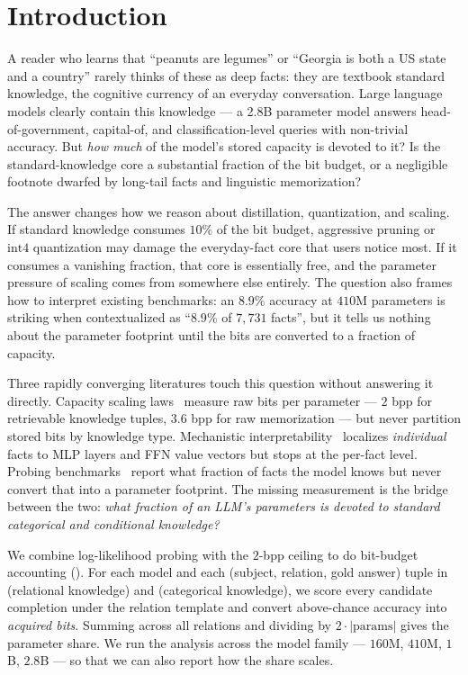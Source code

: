\section{Introduction}
\label{sec:intro}

A reader who learns that ``peanuts are legumes'' or ``Georgia is both a US state and a country'' rarely thinks of these as deep facts: they are textbook standard knowledge, the cognitive currency of an everyday conversation. Large language models clearly contain this knowledge --- a 2.8B parameter model answers head-of-government, capital-of, and classification-level queries with non-trivial accuracy. But \emph{how much} of the model's stored capacity is devoted to it? Is the standard-knowledge core a substantial fraction of the bit budget, or a negligible footnote dwarfed by long-tail facts and linguistic memorization?

 The answer changes how we reason about distillation, quantization, and scaling. If standard knowledge consumes \(10\%\) of the bit budget, aggressive pruning or \(\text{int}4\) quantization may damage the everyday-fact core that users notice most. If it consumes a vanishing fraction, that core is essentially free, and the parameter pressure of scaling comes from somewhere else entirely. The question also frames how to interpret existing benchmarks: an \(8.9\%\) \bear accuracy at \(410\)M parameters is striking when contextualized as ``\(8.9\%\) of \(7{,}731\) facts'', but it tells us nothing about the parameter footprint until the bits are converted to a fraction of capacity.

 Three rapidly converging literatures touch this question without answering it directly. Capacity scaling laws~\citep{allenzhu2024knowledge,morris2025memorize} measure raw bits per parameter --- \(2\) bpp for retrievable knowledge tuples, \(3.6\) bpp for raw memorization --- but never partition stored bits by knowledge type. Mechanistic interpretability~\citep{geva2021ffnkv,dai2022knowledge,meng2022rome,hong2025specialization} localizes \emph{individual} facts to MLP layers and FFN value vectors but stops at the per-fact level. Probing benchmarks~\citep{petroni2019lama,wiland2024bear,powell2024taxi} report what fraction of facts the model knows but never convert that into a parameter footprint. The missing measurement is the bridge between the two: \emph{what fraction of an LLM's parameters is devoted to standard categorical and conditional knowledge?}

 We combine log-likelihood probing with the \(2\)-bpp ceiling to do bit-budget accounting (). For each model and each (subject, relation, gold answer) tuple in \bear (relational knowledge) and \taxi (categorical knowledge), we score every candidate completion under the relation template and convert above-chance accuracy into \emph{acquired bits}. Summing across all relations and dividing by \(2 \cdot |\text{params}|\) gives the parameter share. We run the analysis across the \pythia model family --- \(160\)M, \(410\)M, \(1\)B, \(2.8\)B --- so that we can also report how the share scales.

